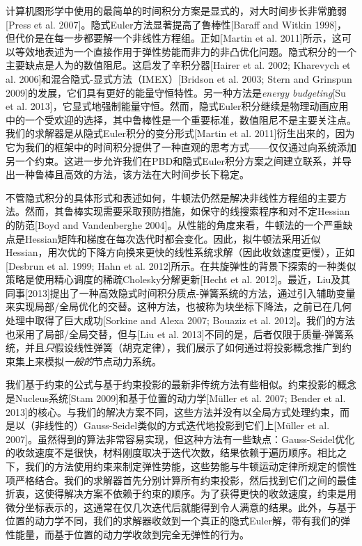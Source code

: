 \begin{translation}
计算机图形学中使用的最简单的时间积分方案是显式的，对大时间步长非常脆弱[Press et al. 2007]。隐式Euler方法显著提高了鲁棒性[Baraff and Witkin 1998]，但代价是在每一步都要解一个非线性方程组。正如[Martin et al. 2011]所示，这可以等效地表述为一个直接作用于弹性势能而非力的非凸优化问题。隐式积分的一个主要缺点是人为的数值阻尼。这启发了辛积分器[Hairer et al. 2002; Kharevych et al. 2006]和混合隐式-显式方法（IMEX）[Bridson et al. 2003; Stern and Grinspun 2009]的发展，它们具有更好的能量守恒特性。另一种方法是\emph{energy budgeting}[Su et al. 2013]，它显式地强制能量守恒。然而，隐式Euler积分继续是物理动画应用中的一个受欢迎的选择，其中鲁棒性是一个重要标准，数值阻尼不是主要关注点。我们的求解器是从隐式Euler积分的变分形式[Martin et al. 2011]衍生出来的，因为它为我们的框架中的时间积分提供了一种直观的思考方式——仅仅通过向系统添加另一个约束。这进一步允许我们在PBD和隐式Euler积分方案之间建立联系，并导出一种鲁棒且高效的方法，该方法在大时间步长下稳定。

不管隐式积分的具体形式和表述如何，牛顿法仍然是解决非线性方程组的主要方法。然而，其鲁棒实现需要采取预防措施，如保守的线搜索程序和对不定Hessian的防范[Boyd and Vandenberghe 2004]。从性能的角度来看，牛顿法的一个严重缺点是Hessian矩阵和梯度在每次迭代时都会变化。因此，拟牛顿法采用近似Hessian，用次优的下降方向换来更快的线性系统求解（因此收敛速度更慢），正如[Desbrun et al. 1999; Hahn et al. 2012]所示。在共旋弹性的背景下探索的一种类似策略是使用精心调度的稀疏Cholesky分解更新[Hecht et al. 2012]。最近，Liu及其同事[2013]提出了一种高效隐式时间积分质点-弹簧系统的方法，通过引入辅助变量来实现局部/全局优化的交替。这种方法，也被称为块坐标下降法，之前已在几何处理中取得了巨大成功[Sorkine and Alexa 2007; Bouaziz et al. 2012]。我们的方法也采用了局部/全局交替，但与[Liu et al. 2013]不同的是，后者仅限于质量-弹簧系统，并且\emph{只}假设线性弹簧（胡克定律），我们展示了如何通过将投影概念推广到约束集上来模拟\emph{一般的}节点动力系统。

我们基于约束的公式与基于约束投影的最新非传统方法有些相似。约束投影的概念是Nucleus系统[Stam 2009]和基于位置的动力学[Müller et al. 2007; Bender et al. 2013]的核心。与我们的解决方案不同，这些方法并没有以全局方式处理约束，而是以（非线性的）Gauss-Seidel类似的方式迭代地投影到它们上[Müller et al. 2007]。虽然得到的算法非常容易实现，但这种方法有一些缺点：Gauss-Seidel优化的收敛速度不是很快，材料刚度取决于迭代次数，结果依赖于遍历顺序。相比之下，我们的方法使用约束来制定弹性势能，这些势能与牛顿运动定律所规定的惯性项严格结合。我们的求解器首先分别计算所有约束投影，然后找到它们之间的最佳折衷，这使得解决方案不依赖于约束的顺序。为了获得更快的收敛速度，约束是用微分坐标表示的，这通常在仅几次迭代后就能得到令人满意的结果。此外，与基于位置的动力学不同，我们的求解器收敛到一个真正的隐式Euler解，带有我们的弹性能量，而基于位置的动力学收敛到完全无弹性的行为。


\end{translation}
